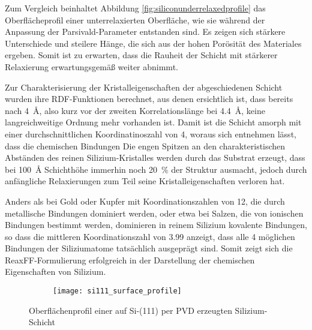 Zum Vergleich beinhaltet Abbildung \ref{fig:siliconunderrelaxedprofile} das Oberflächeprofil einer unterrelaxierten Oberfläche, wie sie während der Anpassung der Parsivald-Parameter entstanden sind.
Es zeigen sich stärkere Unterschiede und steilere Hänge, die sich aus der hohen Porösität des Materiales ergeben.
Somit ist zu erwarten, dass die Rauheit der Schicht mit stärkerer Relaxierung erwartungsgemäß weiter abnimmt.

Zur Charakterisierung der Kristalleigenschaften der abgeschiedenen Schicht wurden ihre RDF-Funktionen berechnet, aus denen ersichtlich ist, dass bereits nach \SI{4}{\angstrom}, also kurz vor der zweiten Korrelationslänge bei \SI{4.4}{\angstrom}, keine langreichweitige Ordnung mehr vorhanden ist.
Damit ist die Schicht amorph mit einer durchschnittlichen Koordinatinoszahl von \num{4}, woraus sich entnehmen lässt, dass die chemischen Bindungen
Die engen Spitzen an den charakteristischen Abständen des reinen Silizium-Kristalles werden durch das Substrat erzeugt, dass bei \SI{100}{\angstrom} Schichthöhe immerhin noch \SI{20}{\percent} der Struktur ausmacht, jedoch durch anfängliche Relaxierungen zum Teil seine Kristalleigenschaften verloren hat.

Anders als bei Gold oder Kupfer mit Koordinationszahlen von 12, die durch metallische Bindungen dominiert werden, oder etwa bei Salzen, die von ionischen Bindungen bestimmt werden, dominieren in reinem Silizium kovalente Bindungen, so dass die mittleren Koordinationszahl von \num{3.99} anzeigt, dass alle 4 möglichen Bindungen der Siliziumatome tatsächlich ausgeprägt sind.
Somit zeigt sich die ReaxFF-Formulierung erfolgreich in der Darstellung der chemischen Eigenschaften von Silizium.

\begin{figure}[H]
  \centering
  \captionsetup[subfigure]{singlelinecheck=false}
  \begin{subfigure}[t]{7.1cm}
    \texttt{[image: si111\_surface\_profile]}
  \end{subfigure}
  \begin{subfigure}[t]{1.7cm}
    \def\svgwidth{\textwidth}
    
  \end{subfigure}
  \caption[Oberflächenprofil einer Silizium-PVD-Schicht]{Oberflächenprofil einer auf Si-(111) per PVD erzeugten Silizium-Schicht}
  \label{fig:siliconprofile}
\end{figure}

